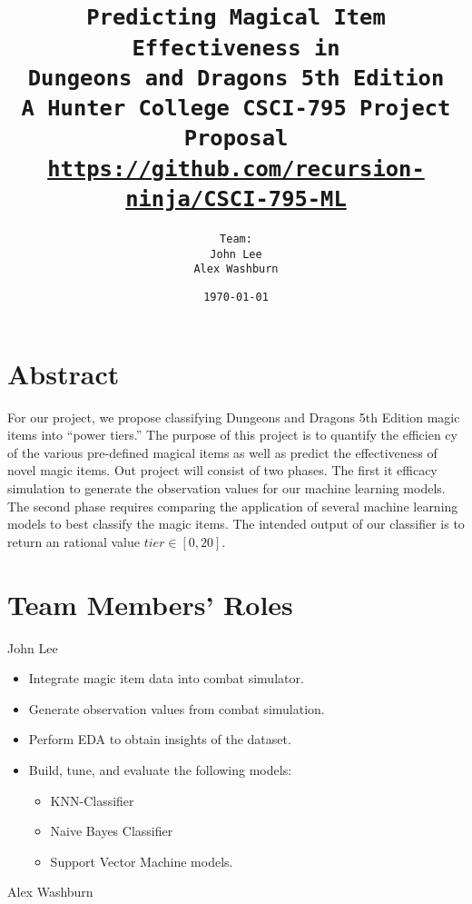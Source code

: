 \documentclass[12pt]{diazessay}
\title{\texttt{\LARGE{Predicting Magical Item Effectiveness in \\Dungeons and Dragons 5th Edition} \\\vspace{-0.35cm} {\large A Hunter College CSCI-795 Project Proposal}\\\normalsize\url{https://github.com/recursion-ninja/CSCI-795-ML}}} %
\author{\texttt{{\Huge Team:}\\\vspace*{-0.5em} 
		John Lee \\\vspace*{-0.5em} 
		Alex Washburn}} %
\date{\texttt{\today}} %
\begin{document}
\maketitle %

\vspace{-1cm}
\section*{Abstract}


For our project, we propose classifying Dungeons and Dragons 5th Edition magic items into ``power tiers.''
The purpose of this project is to quantify the efficien
cy of the various pre-defined magical items as well as predict the effectiveness of novel magic items.
Out project will consist of two phases. The first it efficacy simulation to generate the observation values for our machine learning models.
The second phase requires comparing the application of several machine learning models to best classify the magic items.
The intended output of our classifier is to return an rational value $tier \in [0, 20]$.

\section*{Team Members' Roles}

John Lee

\begin{itemize}
	
	\item Integrate magic item data into combat simulator.
	\item Generate observation values from combat simulation.
	\item Perform EDA to obtain insights of the dataset.
	\item Build, tune, and evaluate the following models:
	\begin{itemize}
		\item KNN-Classifier
		\item Naive Bayes Classifier
		\item Support Vector Machine models.
	\end{itemize}
	
\end{itemize}

Alex Washburn
\end{document}
